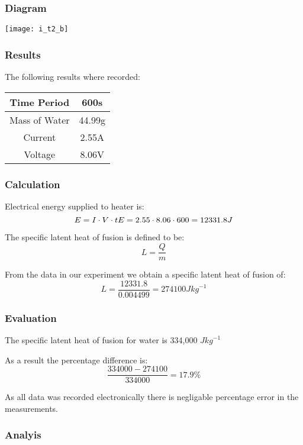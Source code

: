 \subsubsection{Diagram}
\begin{center}
    \texttt{[image: i\_t2\_b]}
\end{center}

\subsubsection{Results}
The following results where recorded:
\begin{center}
    \begin{tabular}{ |c|c| } 
        \hline
        Time Period & 600s \\ \hline
        Mass of Water & 44.99g\\ \hline
        Current & 2.55A \\ \hline
        Voltage & 8.06V \\
        \hline
        \end{tabular}
\end{center}

\subsubsection{Calculation}
Electrical energy supplied to heater is:
\begin{equation*}
    E = I \cdot V \cdot t \\
    E = 2.55 \cdot 8.06 \cdot 600 = 12331.8J\\
\end{equation*}

The specific latent heat of fusion is defined to be:
\begin{equation*}
    L = \frac{Q}{m}
\end{equation*}

From the data in our experiment we obtain a specific latent heat of fusion of:
\begin{equation*}
    L = \frac{12331.8}{0.004499} = 274100 J {kg}^{-1}
\end{equation*}

\subsubsection{Evaluation}
The specific latent heat of fusion for water is 334,000 $J {kg}^{-1}$

As a result the percentage difference is:
\begin{equation*}
    \frac{334000-274100}{334000} = 17.9 \%
\end{equation*}

As all data was recorded electronically there is negligable percentage error in the measurements.

\subsubsection{Analyis}
